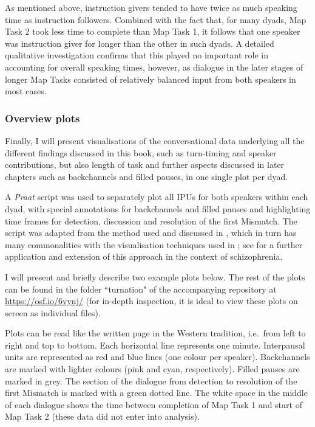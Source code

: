 As mentioned above, instruction givers tended to have twice as much speaking time as instruction followers. Combined with the fact that, for many dyads, Map Task 2 took less time to complete than Map Task 1, it follows that one speaker was instruction giver for longer than the other in such dyads. A detailed qualitative investigation confirms that this played no important role in accounting for overall speaking times, however, as dialogue in the later stages of longer Map Tasks consisted of relatively balanced input from both speakers in most cases.




\subsubsection{Overview plots}\label{turntaking_results_signal_turnation}

Finally, I will present visualisations of the conversational data underlying all the different findings discussed in this book, such as turn-timing and speaker contributions, but also length of task and further aspects discussed in later chapters such as backchannels and filled pauses, in one single plot per dyad.

A \emph{Praat} script was used to separately plot all IPUs for both speakers within each dyad, with special annotations for backchannels and filled pauses and highlighting time frames for detection, discussion and resolution of the first Mismatch. The script was adapted from the method used and discussed in \citet{sbrannaQuantifyingL2Interactional2021}, which in turn has many commonalities with the visualisation techniques used in \citet{trouvainExploringSequencesSpeech2013,campbellApproachesConversationalSpeech2007}; see \citet{cangemiContentfreeSpeechActivity2023} for a further application and extension of this approach in the context of schizophrenia.

I will present and briefly describe two example plots below. The rest of the plots can be found in the folder ``turnation" of the accompanying repository at \url{https://osf.io/6vynj/} (for in-depth inspection, it is ideal to view these plots on screen as individual files).

Plots can be read like the written page in the Western tradition, i.e.~from left to right and top to bottom. Each horizontal line represents one minute. Interpausal units are represented as red and blue lines (one colour per speaker). Backchannels are marked with lighter colours (pink and cyan, respectively). Filled pauses are marked in grey. The section of the dialogue from detection to resolution of the first Mismatch is marked with a green dotted line. The white space in the middle of each dialogue shows the time between completion of Map Task 1 and start of Map Task 2 (these data did not enter into analysis).

